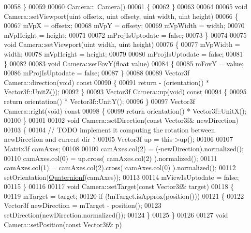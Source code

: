 \begin{DoxyCode}
00058 \}
00059 
00060 Camera::~Camera()
00061 \{
00062 \}
00063 
00064 
00065 \textcolor{keywordtype}{void} Camera::setViewport(uint offsetx, uint offsety, uint width, uint height)
00066 \{
00067     mVpX = offsetx;
00068     mVpY = offsety;
00069     mVpWidth = width;
00070     mVpHeight = height;
00071     
00072     mProjIsUptodate = \textcolor{keyword}{false};
00073 \}
00074 
00075 \textcolor{keywordtype}{void} Camera::setViewport(uint width, uint height)
00076 \{
00077     mVpWidth = width;
00078     mVpHeight = height;
00079     
00080     mProjIsUptodate = \textcolor{keyword}{false};
00081 \}
00082 
00083 \textcolor{keywordtype}{void} Camera::setFovY(\textcolor{keywordtype}{float} value)
00084 \{
00085     mFovY = value;
00086     mProjIsUptodate = \textcolor{keyword}{false};
00087 \}
00088 
00089 Vector3f Camera::direction(\textcolor{keywordtype}{void})\textcolor{keyword}{ const}
00090 \textcolor{keyword}{}\{
00091     \textcolor{keywordflow}{return} - (orientation() * Vector3f::UnitZ());
00092 \}
00093 Vector3f Camera::up(\textcolor{keywordtype}{void})\textcolor{keyword}{ const}
00094 \textcolor{keyword}{}\{
00095     \textcolor{keywordflow}{return} orientation() * Vector3f::UnitY();
00096 \}
00097 Vector3f Camera::right(\textcolor{keywordtype}{void})\textcolor{keyword}{ const}
00098 \textcolor{keyword}{}\{
00099     \textcolor{keywordflow}{return} orientation() * Vector3f::UnitX();
00100 \}
00101 
00102 \textcolor{keywordtype}{void} Camera::setDirection(\textcolor{keyword}{const} Vector3f& newDirection)
00103 \{
00104     \textcolor{comment}{// TODO implement it computing the rotation between newDirection and current dir ?}
00105     Vector3f up = this->up();
00106     
00107     Matrix3f camAxes;
00108 
00109     camAxes.col(2) = (-newDirection).normalized();
00110     camAxes.col(0) = up.cross( camAxes.col(2) ).normalized();
00111     camAxes.col(1) = camAxes.col(2).cross( camAxes.col(0) ).normalized();
00112     setOrientation(\hyperlink{group___geometry___module_ga785b13a5a87f9bf55d4eba51ead2dcf0}{Quaternionf}(camAxes));
00113     
00114     mViewIsUptodate = \textcolor{keyword}{false};
00115 \}
00116 
00117 \textcolor{keywordtype}{void} Camera::setTarget(\textcolor{keyword}{const} Vector3f& target)
00118 \{
00119     mTarget = target;
00120     \textcolor{keywordflow}{if} (!mTarget.isApprox(position()))
00121     \{
00122         Vector3f newDirection = mTarget - position();
00123         setDirection(newDirection.normalized());
00124     \}
00125 \}
00126 
00127 \textcolor{keywordtype}{void} Camera::setPosition(\textcolor{keyword}{const} Vector3f& p)

\end{DoxyCode}
